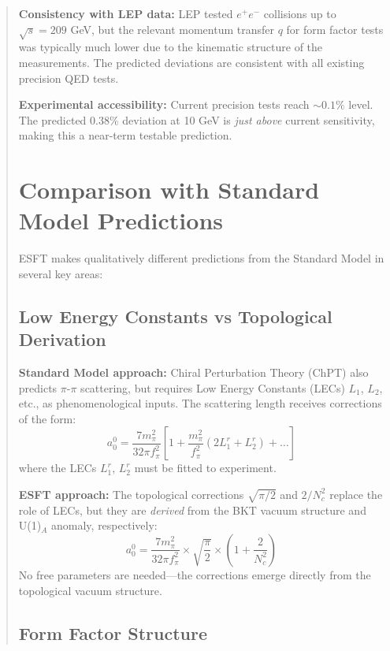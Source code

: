 ﻿\documentclass[twocolumn,prd,amsmath,amssymb,aps]{revtex4-2}
\begin{document}
\begin{abstract}
\textbf{Consistency with LEP data:} LEP tested $e^+e^-$ collisions up to $\sqrt{s} = 209$ GeV, but the relevant momentum transfer $q$ for form factor tests was typically much lower due to the kinematic structure of the measurements. The predicted deviations are consistent with all existing precision QED tests.

\textbf{Experimental accessibility:} Current precision tests reach $\sim 0.1\%$ level. The predicted 0.38\% deviation at 10 GeV is \emph{just above} current sensitivity, making this a near-term testable prediction.

\section{Comparison with Standard Model Predictions}

ESFT makes qualitatively different predictions from the Standard Model in several key areas:

\subsection{Low Energy Constants vs Topological Derivation}

\textbf{Standard Model approach:} Chiral Perturbation Theory (ChPT) also predicts $\pi$-$\pi$ scattering, but requires Low Energy Constants (LECs) $L_1$, $L_2$, etc., as phenomenological inputs. The scattering length receives corrections of the form:
\begin{equation}
a_0^0 = \frac{7m_\pi^2}{32\pi f_\pi^2}\left[1 + \frac{m_\pi^2}{f_\pi^2}(2L_1^r + L_2^r) + \ldots\right]
\end{equation}
where the LECs $L_1^r$, $L_2^r$ must be fitted to experiment.

\textbf{ESFT approach:} The topological corrections $\sqrt{\pi/2}$ and $2/N_c^2$ replace the role of LECs, but they are \emph{derived} from the BKT vacuum structure and U(1)$_A$ anomaly, respectively:
\begin{equation}
a_0^0 = \frac{7m_\pi^2}{32\pi f_\pi^2} \times \sqrt{\frac{\pi}{2}} \times \left(1 + \frac{2}{N_c^2}\right)
\end{equation}
No free parameters are needed---the corrections emerge directly from the topological vacuum structure.

\subsection{Form Factor Structure}


\end{abstract}
\end{document}
